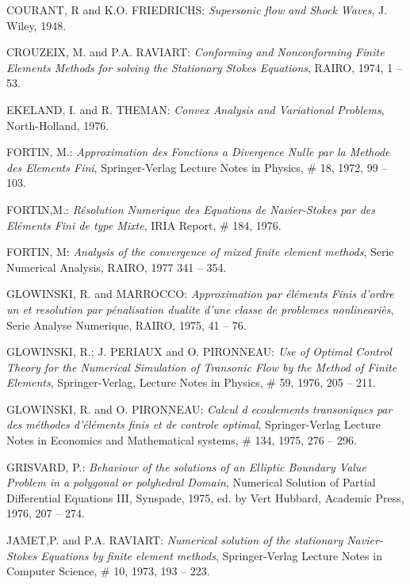 \begin{thebibliography}{99}
 COURANT, R and K.O. FRIEDRICHS: \emph{Supersonic flow
  and Shock Waves}, J. Wiley, 1948.

 CROUZEIX, M. and P.A. RAVIART: \emph{Conforming and
  Nonconforming Finite Elements Methods for solving the Stationary
  Stokes Equations}, RAIRO, 1974, 1 -- 53.

 EKELAND, I. and R. THEMAN: \emph{Convex Analysis and
  Variational Problems}, North-Holland, 1976.

 FORTIN, M.: \emph{Approximation des Fonctions a
  Divergence Nulle par la Methode des Elements Fini}, Springer-Verlag
  Lecture Notes in Physics, \# 18, 1972, 99 -- 103.

 FORTIN,\pageoriginale M.: \emph{R\'esolution Numerique
  des Equations de Navier-Stokes par des El\'ements Fini de type
  Mixte}, IRIA Report, \# 184, 1976.

 FORTIN, M: \emph{Analysis of the convergence of mixed
  finite element methods}, Serie Numerical Analysis, RAIRO, 1977 341
  -- 354.

 GLOWINSKI, R. and MARROCCO: \emph{Approximation par
  \'el\'ements Finis d'ordre un et resolution par p\'enalisation
  dualite d'une classe de problemes nonlineari\`es}, Serie Analyse
  Numerique, RAIRO, 1975, 41 -- 76.

 GLOWINSKI, R.; J. PERIAUX and O. PIRONNEAU: \emph{Use
  of Optimal Control Theory for the Numerical Simulation of Transonic
  Flow by the Method of Finite Elements}, Springer-Verlag, Lecture
  Notes in Physics, \# 59, 1976, 205 -- 211.

 GLOWINSKI, R. and O. PIRONNEAU: \emph{Calcul d
  ecoulements transoniques par des m\'ethodes d'\'el\'ements finis et
  de controle optimal}, Springer-Verlag Lecture Notes in Economics and
  Mathematical systems, \# 134, 1975, 276 -- 296.

 GRISVARD, P.: \emph{Behaviour of the solutions of an
  Elliptic Boundary Value Problem in a polygonal or polyhedral Domain},
  Numerical Solution of Partial Differential Equations III, Synspade,
  1975, ed. by Vert Hubbard, Academic Press, 1976, 207 -- 274.

 JAMET,\pageoriginale P. and P.A. RAVIART:
  \emph{Numerical solution of the stationary Navier-Stokes Equations
    by finite element methods}, Springer-Verlag Lecture Notes in
  Computer Science, \# 10, 1973, 193 -- 223.


\end{thebibliography}
